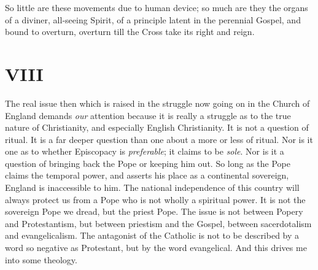 \documentclass[12pt,a5paper,twoside]{book}
\begin{document}
So little are these movements due to human device; 
so much are they the organs of a diviner, all-seeing 
Spirit, of a principle latent in the perennial Gospel, 
and bound to overturn, overturn till the Cross take 
its right and reign. 

\section*{VIII}

The real issue then which is raised in the struggle 
now going on in the Church of England demands \textit{our} 
attention because it is really a struggle as to the true 
nature of Christianity, and especially English Christianity. 
It is not a question of ritual. It is a far 
deeper question than one about a more or less of 
ritual. Nor is it one as to whether Episcopacy is 
\textit{preferable}; it claims to be \textit{sole}. Nor is it a 
question of bringing back the Pope or keeping him 
out. So long as the Pope claims the temporal power, 
and asserts his place as a continental sovereign, 
England is inaccessible to him. The national independence 
of this country will always protect us 
from a Pope who is not wholly a spiritual power. It 
is not the sovereign Pope we dread, but the priest 
Pope. The issue is not between Popery and Protestantism, 
but between priestism and the Gospel, 
between sacerdotalism and evangelicalism. The 
antagonist of the Catholic is not to be described by 
a word so negative as Protestant, but by the word 
evangelical. And this drives me into some theology. 
\end{document}
